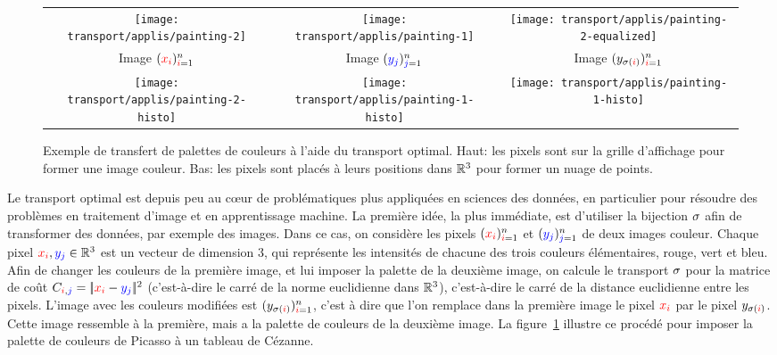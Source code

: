 \begin{figure}\centering
\begin{tabular}{@{}c@{\hspace{1mm}}c@{\hspace{1mm}}c@{}}
    \texttt{[image: transport/applis/painting-2]} &
    \texttt{[image: transport/applis/painting-1]} &
    \texttt{[image: transport/applis/painting-2-equalized]} \\
    Image $({\color{red}x_i})_{{\color{red}i}=1}^n$ & Image $({\color{blue}y_j})_{{\color{blue}j}=1}^n$ & Image  $(y_{\sigma({\color{red}i})})_{{\color{red}i}=1}^n$ \\
    \texttt{[image: transport/applis/painting-2-histo]}&
    \texttt{[image: transport/applis/painting-1-histo]}&
    \texttt{[image: transport/applis/painting-1-histo]}
\end{tabular}
\caption{\label{fig:image-eq} Exemple de transfert de palettes de couleurs à l'aide du transport optimal. 
	Haut: les pixels sont sur la grille d'affichage pour former une image couleur. 	
	Bas: les pixels sont placés à leurs positions dans $\mathbb{R}^3$ pour former un nuage de points. }
\end{figure}

Le transport optimal est depuis peu au c\oe{}ur de problématiques plus appliquées en sciences des données, en particulier pour résoudre des problèmes en traitement d'image et en apprentissage machine. 
%
La première idée, la plus immédiate, est d'utiliser la bijection $\sigma$ afin de transformer des données, par exemple des images. Dans ce cas, on considère les pixels $({\color{red}x_i})_{{\color{red}i}=1}^n$ et $({\color{blue}y_j})_{{\color{blue}j}=1}^n$ de deux images couleur. Chaque pixel ${\color{red}x_i}, {\color{blue}y_j} \in \mathbb{R}^3$ est un vecteur de dimension 3, qui représente les intensités de chacune des trois couleurs élémentaires, rouge, vert et bleu. Afin de changer les couleurs de la première image, et lui imposer la palette de la deuxième image, on calcule le transport $\sigma$ pour la matrice de coût $C_{{\color{red}i},{\color{blue}j}} = |\!| {\color{red}x_i} - {\color{blue}y_j} |\!|^2$ (c'est-à-dire le carré de la norme euclidienne dans $\mathbb{R}^3$), c'est-à-dire le carré de la distance euclidienne entre les pixels. L'image avec les couleurs modifiées est $(y_{\sigma({\color{red}i})})_{{\color{red}i}=1}^n$, c'est à dire que l'on remplace dans la première image le pixel ${\color{red}x_i}$ par le pixel $y_{\sigma({\color{red}i})}$. Cette image ressemble à la première, mais a la palette de couleurs de la deuxième image.
%
La figure~\ref{fig:image-eq} illustre ce procédé pour imposer la palette de couleurs de Picasso à un tableau de Cézanne. 


